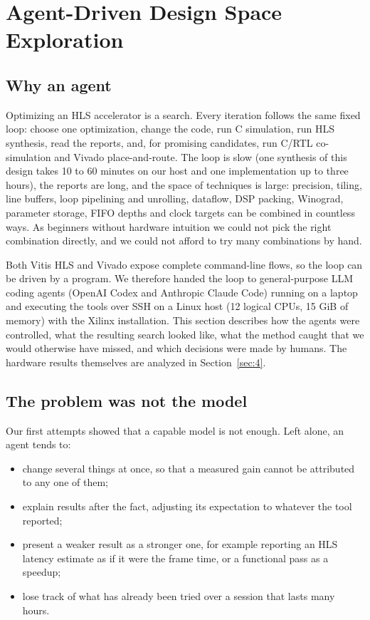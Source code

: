 \section{Agent-Driven Design Space Exploration}\label{sec:3}

\subsection{Why an agent}\label{sec:3.1}

Optimizing an HLS accelerator is a search. Every iteration follows the same fixed loop: choose one optimization, change the code, run C simulation, run HLS synthesis, read the reports, and, for promising candidates, run C/RTL co-simulation and Vivado place-and-route. The loop is slow (one synthesis of this design takes 10 to 60 minutes on our host and one implementation up to three hours), the reports are long, and the space of techniques is large: precision, tiling, line buffers, loop pipelining and unrolling, dataflow, DSP packing, Winograd, parameter storage, FIFO depths and clock targets can be combined in countless ways. As beginners without hardware intuition we could not pick the right combination directly, and we could not afford to try many combinations by hand.

Both Vitis HLS and Vivado expose complete command-line flows, so the loop can be driven by a program. We therefore handed the loop to general-purpose LLM coding agents (OpenAI Codex and Anthropic Claude Code) running on a laptop and executing the tools over SSH on a Linux host (12 logical CPUs, 15 GiB of memory) with the Xilinx installation. This section describes how the agents were controlled, what the resulting search looked like, what the method caught that we would otherwise have missed, and which decisions were made by humans. The hardware results themselves are analyzed in Section~\ref{sec:4}.

\subsection{The problem was not the model}\label{sec:3.2}

Our first attempts showed that a capable model is not enough. Left alone, an agent tends to:

\begin{itemize}
\item change several things at once, so that a measured gain cannot be attributed to any one of them;
\item explain results after the fact, adjusting its expectation to whatever the tool reported;
\item present a weaker result as a stronger one, for example reporting an HLS latency estimate as if it were the frame time, or a functional pass as a speedup;
\item lose track of what has already been tried over a session that lasts many hours.
\end{itemize}

